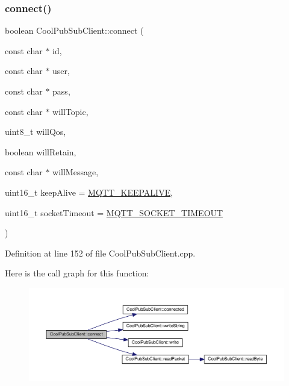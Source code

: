 \subsubsection{\texorpdfstring{connect()}{connect()}\hspace{0.1cm}{\footnotesize\ttfamily [4/4]}}
{\footnotesize\ttfamily boolean Cool\+Pub\+Sub\+Client\+::connect (\begin{DoxyParamCaption}\item[{const char $\ast$}]{id,  }\item[{const char $\ast$}]{user,  }\item[{const char $\ast$}]{pass,  }\item[{const char $\ast$}]{will\+Topic,  }\item[{uint8\+\_\+t}]{will\+Qos,  }\item[{boolean}]{will\+Retain,  }\item[{const char $\ast$}]{will\+Message,  }\item[{uint16\+\_\+t}]{keep\+Alive = {\ttfamily \hyperlink{_cool_pub_sub_client_8h_afb4dd8c75385ab30e659314df7c2c335}{M\+Q\+T\+T\+\_\+\+K\+E\+E\+P\+A\+L\+I\+VE}},  }\item[{uint16\+\_\+t}]{socket\+Timeout = {\ttfamily \hyperlink{_cool_pub_sub_client_8h_a092cc564e4d7f03fdab6137e30a7f05b}{M\+Q\+T\+T\+\_\+\+S\+O\+C\+K\+E\+T\+\_\+\+T\+I\+M\+E\+O\+UT}} }\end{DoxyParamCaption})}



Definition at line 152 of file Cool\+Pub\+Sub\+Client.\+cpp.

Here is the call graph for this function\+:
\nopagebreak
\begin{figure}[H]
\begin{center}
\leavevmode
\includegraphics[width=350pt]{class_cool_pub_sub_client_a7e5a85731dd25d90a41f6d859e61da77_cgraph}
\end{center}
\end{figure}
\mbox{\label{class_cool_pub_sub_client_a3d5a5da4ddb1e5c1bea64d80c665d148}} 

